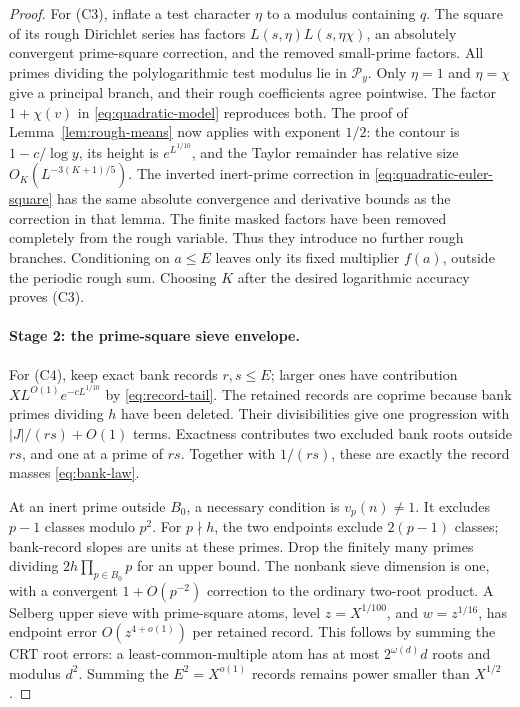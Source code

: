 \begin{proof}
For (C3), inflate a test character \(\eta\) to a modulus
containing \(q\). The square of its rough Dirichlet series has
factors \(L(s,\eta)L(s,\eta\chi)\), an absolutely convergent
prime-square correction, and the removed small-prime factors.
All primes dividing the polylogarithmic test modulus lie in \(\mathcal P_y\).
Only \(\eta=1\) and \(\eta=\chi\) give a principal branch,
and their rough coefficients agree pointwise. The factor
\(1+\chi(v)\) in \eqref{eq:quadratic-model} reproduces both.
The proof of Lemma~\ref{lem:rough-means} now applies with exponent
\(1/2\): the contour is \(1-c/\log y\), its height is
\(e^{L^{1/10}}\), and the Taylor remainder has relative size
\(O_K(L^{-3(K+1)/5})\). The inverted inert-prime correction
in \eqref{eq:quadratic-euler-square} has the same absolute
convergence and derivative bounds as the correction in that lemma.
The finite masked factors have been removed completely from the
rough variable. Thus they introduce no further rough branches.
Conditioning on \(a\le E\) leaves only its fixed multiplier
\(f(a)\), outside the periodic rough sum. Choosing \(K\)
after the desired logarithmic accuracy proves (C3).

\paragraph{Stage 2: the prime-square sieve envelope.}
For (C4), keep exact bank records \(r,s\le E\); larger ones
have contribution \(XL^{O(1)}e^{-cL^{1/10}}\) by
\eqref{eq:record-tail}. The retained records are coprime because
bank primes dividing \(h\) have been deleted. Their divisibilities
give one progression with \(|J|/(rs)+O(1)\) terms.
Exactness contributes two excluded bank roots outside \(rs\),
and one at a prime of \(rs\). Together with \(1/(rs)\), these
are exactly the record masses \eqref{eq:bank-law}.

At an inert prime outside \(B_0\), a necessary condition is
\(v_p(n)\ne1\). It excludes \(p-1\) classes modulo \(p^2\).
For \(p\nmid h\), the two endpoints exclude \(2(p-1)\)
classes; bank-record slopes are units at these primes. Drop the
finitely many primes dividing \(2h\prod_{p\in B_0}p\) for
an upper bound. The nonbank sieve dimension is one, with a
convergent \(1+O(p^{-2})\) correction to the ordinary two-root
product. A Selberg upper sieve with prime-square atoms, level
\(z=X^{1/100}\), and \(w=z^{1/16}\), has endpoint error
\(O(z^{4+o(1)})\) per retained record. This follows by summing
the CRT root errors: a least-common-multiple atom has at most
\(2^{\omega(d)}d\) roots and modulus \(d^2\).
Summing the \(E^2=X^{o(1)}\) records remains power smaller
than \(X^{1/2}\).


\end{proof}
